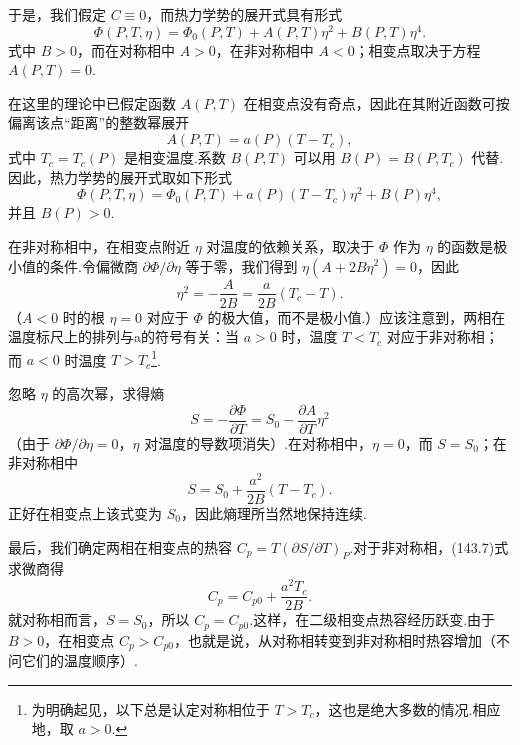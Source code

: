 于是，我们假定 $C\equiv0$，而热力学势的展开式具有形式
\begin{equation}
  \Phi(P,T,\eta)=\Phi_0(P,T)+A(P,T)\eta^2+B(P,T)\eta^4.
\end{equation}
式中 $B>0$，而在对称相中 $A>0$，在非对称相中 $A<0$；相变点取决于方程 $A(P,T)=0$.

在这里的理论中已假定函数 $A(P,T)$ 在相变点没有奇点，因此在其附近函数可按偏离该点“距离”的整数幂展开
\begin{equation}
  A(P,T)=a(P)(T-T_c),
\end{equation}
式中 $T_c=T_c(P)$ 是相变温度.系数 $B(P,T)$ 可以用 $B(P)=B(P,T_c)$ 代替.因此，热力学势的展开式取如下形式
\begin{equation}
  \Phi(P,T,\eta)=\Phi_0(P,T)+a(P)(T-T_c)\eta^2+B(P)\eta^4,
\end{equation}
并且 $B(P)>0$.

在非对称相中，在相变点附近 $\eta$ 对温度的依赖关系，取决于 $\Phi$ 作为 $\eta$ 的函数是极小值的条件.令偏微商 $\partial\Phi/\partial\eta$ 等于零，我们得到 $\eta(A+2B\eta^2)=0$，因此
\begin{equation}
  \eta^2=-\frac{A}{2B}=\frac{a}{2B}(T_c-T).
\end{equation}
（$A<0$ 时的根 $\eta=0$ 对应于 $\Phi$ 的极大值，而不是极小值.）应该注意到，两相在温度标尺上的排列与a的符号有关：当 $a>0$ 时，温度 $T<T_c$ 对应于非对称相；而 $a<0$ 时温度 $T>T_c$\footnote{为明确起见，以下总是认定对称相位于 $T>T_c$，这也是绝大多数的情况.相应地，取 $a>0$.}.

忽略 $\eta$ 的高次幂，求得熵
\begin{equation*}
  S=-\frac{\partial\Phi}{\partial T}=S_0-\frac{\partial A}{\partial T}\eta^2
\end{equation*}
（由于 $\partial\Phi/\partial\eta=0$，$\eta$ 对温度的导数项消失）.在对称相中，$\eta=0$，而 $S=S_0$；在非对称相中
\begin{equation}
  S=S_0+\frac{a^2}{2B}(T-T_c).
\end{equation}
正好在相变点上该式变为 $S_0$，因此熵理所当然地保持连续.

最后，我们确定两相在相变点的热容 $C_p=T(\partial S/\partial T)_P$.对于非对称相，(143.7)式求微商得
\begin{equation}
  C_p=C_{p0}+\frac{a^2T_c}{2B}.
\end{equation}
就对称相而言，$S=S_0$，所以 $C_p=C_{p0}$.这样，在二级相变点热容经历跃变.由于 $B>0$，在相变点 $C_p>C_{p0}$，也就是说，从对称相转变到非对称相时热容增加（不问它们的温度顺序）.


